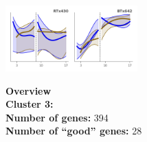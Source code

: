 \begin{multicols}{2}
\includegraphics[width=2in]{figures/clusters/leaf_Preflowering_2.png}
\columnbreak

\noindent \textbf{Overview}\\\textbf{Cluster 3:}  \\
\textbf{Number of genes:} 394 \\
\textbf{Number of ``good'' genes:} 28 \\
\end{multicols}

